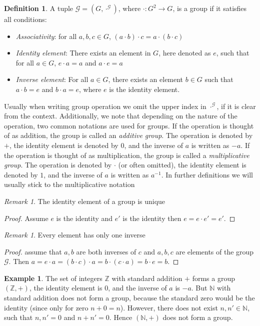 \documentclass{pracalicmgr2025}
\theoremstyle{plain}            %
\theoremstyle{remark}           %
\newtheorem{remark}[theorem]{Remark}
\theoremstyle{definition}       %
\newtheorem{example}[theorem]{Example}
\newtheorem{definition}[theorem]{Definition}
\begin{document}
\begin{definition}
     A tuple $\mathcal{G} = (G,\cdot^\mathcal{G})$, where $\cdot:G^2 \to G$, is a group  if it satisfies all conditions:
\begin{itemize}
    \item \textit{Associativity}: for all $a,b,c \in G$, $(a\cdot b) \cdot c = a \cdot (b \cdot c)$
    \item \textit{Identity element}:  There exists an element in $G$, here denoted as $e$, such that for all $a \in G$, $e \cdot a = a$ and $a \cdot e = a$
    \item \textit{Inverse element}: For all $a\in G$, there exists an element $b\in G$ such that $a \cdot b = e$ and $b \cdot a = e$, where $e$ is the identity element.
\end{itemize}



\end{definition}
Usually when writing group operation we omit the upper index in $\cdot^\mathcal{G}$, if it is clear from the context. Additionally, we note that depending on the nature of the operation, two common notations are used for groups. If the operation is thought of as addition, the group is called an \textit{additive group}. The operation is denoted by $+$, the identity element is denoted by $0$, and the inverse of $a$ is written as $-a$. If the operation is thought of as multiplication, the group is called a \textit{multiplicative group}. The operation is denoted by $\cdot$ (or often omitted), the identity element is denoted by $1$, and the inverse of $a$ is written as $a^{-1}$. In further definitions we will usually stick to the multiplicative notation
\begin{remark}
    The identity element of a group is unique
\end{remark}
\begin{proof}
    
Assume $e$ is the identity and $e'$ is the identity then $e = e \cdot e' = e'$.
\end{proof}
\begin{remark}
    Every element has only one inverse
\end{remark} 
\begin{proof}   
assume that $a,b$ are both inverses of $c$ and $a,b,c$ are elements of the group $\mathcal{G}$. Then $a = e \cdot a = (b \cdot c)\cdot a = b \cdot (c \cdot a) = b \cdot e = b$.
\end{proof}

\begin{example}
       The set of integers $\mathbb{Z}$ with standard addition $+$ forms a group $(\mathbb{Z},+)$, the identity element is $0$, and the inverse of $a$ is $-a$. But $\mathbb{N}$ with standard addition does not form a group, because the standard zero would be the identity (since only for zero $n + 0 =n$). However, there does not exist $n,n' \in \mathbb{N}$, such that $n,n' = 0$ and $n + n' = 0$. Hence $(\mathbb{N},+)$ does not form a group.
\end{example}
\end{document}
